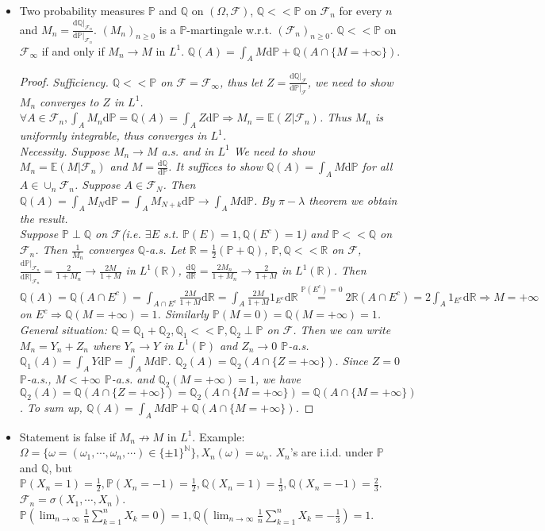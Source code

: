 \documentclass[UTF8]{ctexart}
\theoremstyle{plain}
\theoremstyle{nonumberplain}
\newtheorem{proof}{\small\emph{Proof}}
\numberwithin{equation}{section} %
\newcommand{\RR}{\ensuremath{\mathbb{R}}}
\newcommand{\EE}{\mathbb{E}}
\newcommand{\scr}{\mathscr}
\renewcommand{\P}{\mathbb{P}}
\newcommand{\Q}{\mathbb{Q}}
\renewcommand{\d}{\text{d}}
\begin{document}
\begin{itemize}
  \item Two probability measures $\P$ and $\Q$ on $(\Omega,\scr{F})$, $\Q<<\P$ on $\scr{F}_n$ for every $n$ and $M_n=\frac{\d\Q|_{\scr{F}_n}}{\d\P|_{\scr{F}_n}}$. $(M_n)_{n\geq 0}$ is a $\P$-martingale w.r.t. $(\scr{F}_n)_{n\geq 0}$. $\Q<<\P$ on $\scr{F}_\infty$ if and only if $M_n\to M$ in $L^1$. $\Q(A)=\int_AM\d\P+\Q(A\cap\{M=+\infty\})$.
  \begin{proof}
    \small\emph{Sufficiency. $\Q<<\P$ on $\scr{F}=\scr{F}_\infty$, thus let $Z=\frac{\d\Q|_{\scr{F}}}{\d\P|_{\scr{F}}}$, we need to show $M_n$ converges to $Z$ in $L^1$. $\forall A\in\scr{F}_n,\int_AM_n\d\P=\Q(A)=\int_AZ\d\P\Rightarrow M_n=\EE(Z|\scr{F}_n)$. Thus $M_n$ is uniformly integrable, thus converges in $L^1$.\\
    Necessity. Suppose $M_n\to M$ a.s. and in $L^1$ We need to show $M_n=\EE (M|\scr{F}_n)$ and $M=\frac{\d\Q}{\d\P}$. It suffices to show $\Q(A)=\int_AM\d\P$ for all $A\in\cup_n\scr{F}_n$. Suppose $A\in\scr{F}_N$. Then $\Q(A)=\int_AM_N\d\P=\int_AM_{N+k}\d\P\to \int_AM\d\P$. By $\pi-\lambda$ theorem we obtain the result.\\
    Suppose $\P\perp\Q$ on $\scr{F}$(i.e. $\exists E$ s.t. $\P(E)=1,\Q(E^c)=1$) and $\P<<\Q$ on $\scr{F}_n$. Then $\frac{1}{M_n}$ converges $\Q$-a.s. Let $\mathbb{R}=\frac{1}{2}(\P+\Q)$, $\P,\Q<<\mathbb{R}$ on $\scr{F}$, $\frac{\d\P|_{\scr{F}_n}}{\d\mathbb{R}|_{\scr{F}_n}}=\frac{2}{1+M_n}\to\frac{2M}{1+M}$ in $L^1(\RR)$, $\frac{\d\Q}{\d\mathbb{R}}=\frac{2M_n}{1+M_n}\to\frac{2}{1+M}$ in $L^1(\RR)$. Then $\Q(A)=\Q(A\cap E^c)=\int_{A\cap E^c}\frac{2M}{1+M}\d\RR=\int_A\frac{2M}{1+M}1_{E^c}\d\RR\stackrel{\P(E^c)=0}{=}2\RR(A\cap E^c)=2\int_A1_{E^c}\d\RR\Rightarrow M=+\infty$ on $E^c\Rightarrow \Q(M=+\infty)=1$. Similarly $\P(M=0)=\Q(M=+\infty)=1$.\\
    General situation: $\Q=\Q_1+\Q_2,\Q_1<<\P,\Q_2\perp\P$ on $\scr{F}$. Then we can write $M_n=Y_n+Z_n$ where $Y_n\to Y$ in $L^1(\P)$ and $Z_n\to 0$ $\P$-a.s. $\Q_1(A)=\int_AY\d\P=\int_AM\d\P$. $\Q_2(A)=\Q_2(A\cap\{Z=+\infty\})$. Since $Z=0$ $\P$-a.s., $M<+\infty$ $\P$-a.s. and $\Q_2(M=+\infty)=1$, we have $\Q_2(A)=\Q(A\cap\{Z=+\infty\})=\Q_2(A\cap\{M=+\infty\})=\Q(A\cap\{M=+\infty\})$. To sum up, $\Q(A)=\int_AM\d\P+\Q(A\cap\{M=+\infty\})$.}
  \end{proof}
  \item Statement is false if $M_n\not\to M$ in $L^1$. Example: $\Omega=\{\omega=(\omega_1,\cdots,\omega_n,\cdots)\in\{\pm 1\}^{\mathbb{N}}\},X_n(\omega)=\omega_n$. $X_n$'s are i.i.d. under $\P$ and $\Q$, but $\P(X_n=1)=\frac{1}{2},\P(X_n=-1)=\frac{1}{2},\Q(X_n=1)=\frac{1}{3},\Q(X_n=-1)=\frac{2}{3}$. $\scr{F}_n=\sigma(X_1,\cdots,X_n)$. $\P(\lim_{n\to\infty}\frac{1}{n}\sum_{k=1}^nX_k=0)=1,\Q(\lim_{n\to\infty}\frac{1}{n}\sum_{k=1}^nX_k=-\frac{1}{3})=1$.

\end{itemize}
\end{document}
